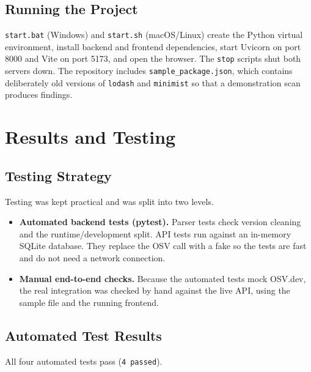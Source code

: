 \documentclass[12pt,a4paper]{report}
\begin{document}
\section{Running the Project}
\texttt{start.bat} (Windows) and \texttt{start.sh} (macOS/Linux) create the Python virtual environment, install backend and frontend dependencies, start Uvicorn on port 8000 and Vite on port 5173, and open the browser. The \texttt{stop} scripts shut both servers down. The repository includes \texttt{sample\_package.json}, which contains deliberately old versions of \texttt{lodash} and \texttt{minimist} so that a demonstration scan produces findings.

\chapter{Results and Testing}

\section{Testing Strategy}
Testing was kept practical and was split into two levels.
\begin{itemize}[leftmargin=*]
  \item \textbf{Automated backend tests (pytest).} Parser tests check version cleaning and the runtime/development split. API tests run against an in-memory SQLite database. They replace the OSV call with a fake so the tests are fast and do not need a network connection.
  \item \textbf{Manual end-to-end checks.} Because the automated tests mock OSV.dev, the real integration was checked by hand against the live API, using the sample file and the running frontend.
\end{itemize}

\section{Automated Test Results}
All four automated tests pass (\texttt{4 passed}).
\end{document}
